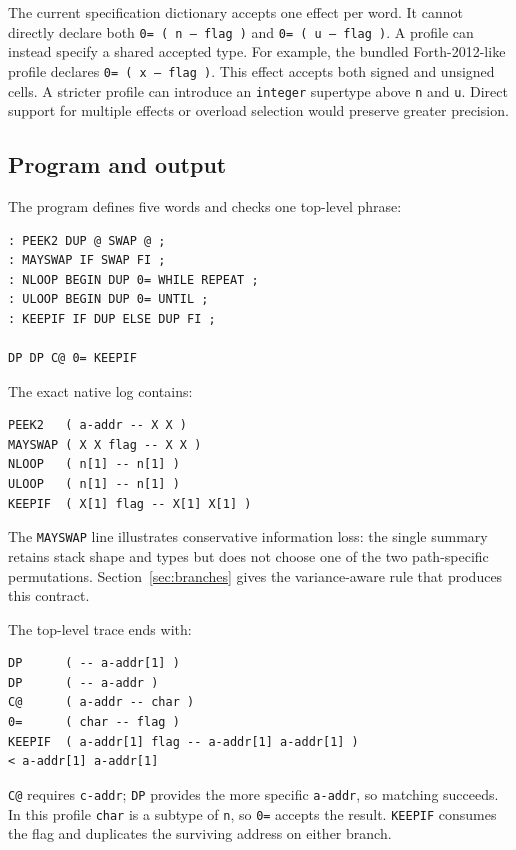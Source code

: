 \documentclass[11pt,a4paper]{article}
\newcommand{\stackeffect}[1]{\mbox{\texttt{#1}}}
\begin{document}
The current specification dictionary accepts one effect per word.  It cannot
directly declare both \stackeffect{0= ( n -- flag )} and
\stackeffect{0= ( u -- flag )}.  A profile can instead specify a shared accepted
type.  For example, the bundled Forth-2012-like profile declares
\stackeffect{0= ( x -- flag )}.  This effect accepts both signed and unsigned cells.
A stricter profile can introduce an \texttt{integer} supertype above
\texttt{n} and \texttt{u}.  Direct support for multiple effects or overload
selection would preserve greater precision.

\subsection{Program and output}

The program defines five words and checks one top-level phrase:

\begin{lstlisting}
: PEEK2 DUP @ SWAP @ ;
: MAYSWAP IF SWAP FI ;
: NLOOP BEGIN DUP 0= WHILE REPEAT ;
: ULOOP BEGIN DUP 0= UNTIL ;
: KEEPIF IF DUP ELSE DUP FI ;

DP DP C@ 0= KEEPIF
\end{lstlisting}

The exact native log contains:

\begin{lstlisting}
PEEK2   ( a-addr -- X X )
MAYSWAP ( X X flag -- X X )
NLOOP   ( n[1] -- n[1] )
ULOOP   ( n[1] -- n[1] )
KEEPIF  ( X[1] flag -- X[1] X[1] )
\end{lstlisting}

The \texttt{MAYSWAP} line illustrates conservative information loss: the
single summary retains stack shape and types but does not choose one of the two
path-specific permutations.  Section~\ref{sec:branches} gives the
variance-aware rule that produces this contract.

The top-level trace ends with:

\begin{lstlisting}
DP      ( -- a-addr[1] )
DP      ( -- a-addr )
C@      ( a-addr -- char )
0=      ( char -- flag )
KEEPIF  ( a-addr[1] flag -- a-addr[1] a-addr[1] )
< a-addr[1] a-addr[1]
\end{lstlisting}

\texttt{C@} requires \texttt{c-addr}; \texttt{DP} provides the more specific
\texttt{a-addr}, so matching succeeds.  In this profile \texttt{char} is a
subtype of \texttt{n}, so \texttt{0=} accepts the result.  \texttt{KEEPIF}
consumes the flag and duplicates the surviving address on either branch.
\end{document}
